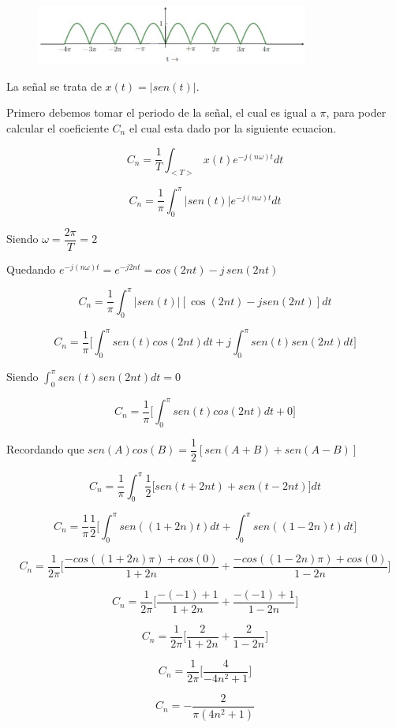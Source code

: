 \begin{figure}[H]
  \centering
  \includegraphics[width=0.8\textwidth]{photos/onda_completa.png}
\end{figure}

La se\~nal se trata de $x(t) = |sen(t)|$.

Primero debemos tomar el periodo de la se\~nal, el cual es igual a $\pi$, para poder calcular el coeficiente $C_n$ el cual esta dado por la siguiente ecuacion.

$$C_n = \dfrac{1}{T} \int_{<T>} x(t) e^{-j(n\omega)t} dt$$

$$C_n = \dfrac{1}{\pi} \int_{0}^{\pi} |sen(t)| e^{-j(n\omega)t} dt$$

Siendo $\omega = \dfrac{2\pi}{T} = 2$

Quedando $e^{-j(n\omega)t} = e^{-j2nt} = cos(2nt)-j\,sen(2nt)$

$$C_n = \dfrac{1}{\pi} \int_{0}^{\pi} |sen(t)| [\cos(2nt) - j sen(2nt)] dt$$

$$C_n = \dfrac{1}{\pi} \bigg[\int_{0}^{\pi} sen(t) cos(2nt) dt + j \int_{0}^{\pi} sen(t) sen(2nt) dt \bigg] $$

Siendo $ \int_{0}^{\pi} sen(t) sen(2nt) dt = 0$

$$C_n = \dfrac{1}{\pi} \bigg[\int_{0}^{\pi} sen(t) cos(2nt) dt + 0 \bigg] $$

Recordando que $sen(A) cos(B) = \dfrac{1}{2} [sen(A+B) + sen(A-B)] $

$$C_n = \dfrac{1}{\pi} \int_{0}^{\pi} \dfrac{1}{2} \bigg[sen(t+2nt)+sen(t-2nt)\bigg] dt $$

$$C_n = \dfrac{1}{\pi}  \dfrac{1}{2} \bigg[\int_{0}^{\pi} sen((1+2n)t) dt + \int_{0}^{\pi}sen((1-2n)t) dt\bigg]$$

$$C_n = \dfrac{1}{2\pi} \bigg[\dfrac{-cos((1+2n)\pi)+cos(0)}{1+2n} + \dfrac{-cos((1-2n)\pi)+cos(0)}{1-2n}  \bigg] $$ 

$$C_n = \dfrac{1}{2\pi} \bigg[\dfrac{-(-1)+1}{1+2n} + \dfrac{-(-1)+1}{1-2n} \bigg]  $$

$$C_n = \dfrac{1}{2\pi} \bigg[\dfrac{2}{1+2n} + \dfrac{2}{1-2n} \bigg] $$

$$C_n = \dfrac{1}{2\pi} \bigg[\dfrac{4}{-4n^2+1}\bigg] $$

$$C_n = -\dfrac{2}{\pi(4n^2+1)}$$

